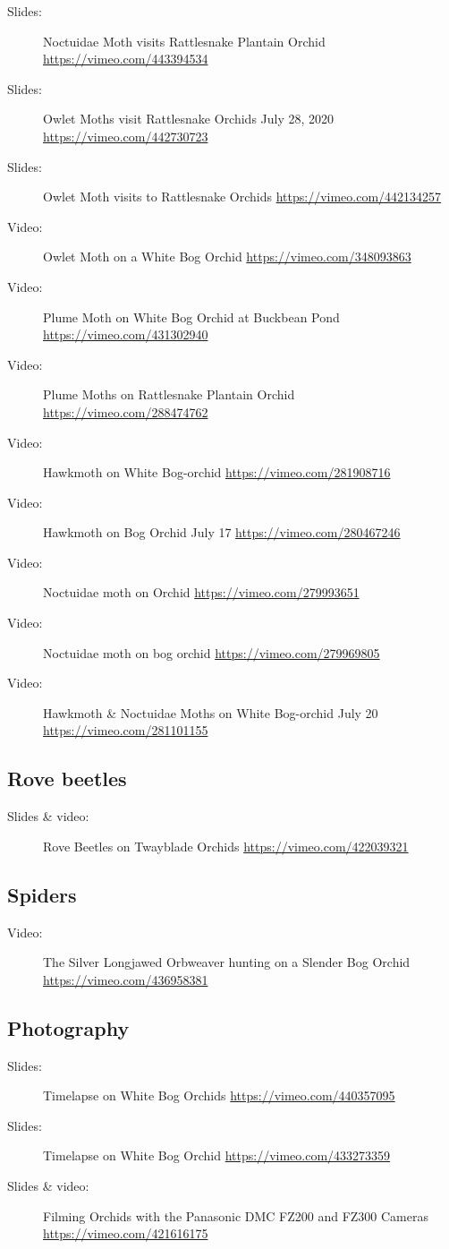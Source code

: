 \begin{description}
\item[Slides:] Noctuidae  Moth visits Rattlesnake Plantain Orchid  \url{https://vimeo.com/443394534}
\item[Slides:] Owlet Moths visit Rattlesnake Orchids July 28, 2020 \url{https://vimeo.com/442730723}
\item[Slides:] Owlet Moth visits to Rattlesnake Orchids \url{https://vimeo.com/442134257}
\item[Video:]  Owlet Moth on a White Bog Orchid \url{https://vimeo.com/348093863}
\item[Video:]  Plume Moth on White Bog Orchid at Buckbean Pond \url{https://vimeo.com/431302940}
\item[Video:]  Plume Moths on Rattlesnake Plantain Orchid \url{https://vimeo.com/288474762}
\item[Video:]  Hawkmoth on White Bog-orchid \url{https://vimeo.com/281908716}
\item[Video:]  Hawkmoth on Bog Orchid July 17 \url{https://vimeo.com/280467246}
\item[Video:]  Noctuidae moth on Orchid \url{https://vimeo.com/279993651}
\item[Video:]  Noctuidae moth on bog orchid \url{https://vimeo.com/279969805}
\item[Video:]  Hawkmoth \& Noctuidae Moths on White Bog-orchid July 20 \url{https://vimeo.com/281101155}
\end{description}

\subsection{Rove beetles}

\begin{description}
\item[Slides \& video:]  Rove Beetles on Twayblade Orchids \url{https://vimeo.com/422039321}
\end{description}

\subsection{Spiders}

\begin{description}
\item[Video:]  The Silver Longjawed Orbweaver hunting on a Slender Bog Orchid \url{https://vimeo.com/436958381}
\end{description}

\subsection{Photography}

\begin{description}
\item[Slides:] Timelapse on White Bog Orchids \url{https://vimeo.com/440357095}
\item[Slides:] Timelapse on White Bog Orchid \url{https://vimeo.com/433273359}
\item[Slides \& video:]  Filming Orchids with the Panasonic DMC FZ200 and FZ300 Cameras \url{https://vimeo.com/421616175}
\end{description}
